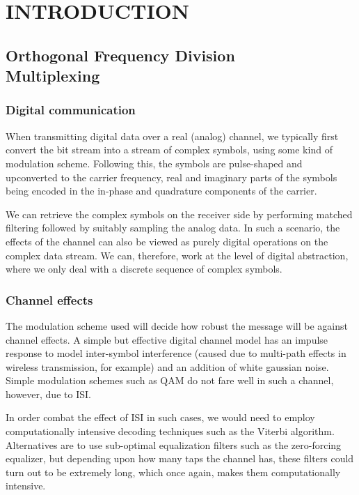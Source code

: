 \chapter{INTRODUCTION}
\label{chap:intro}

\section{Orthogonal Frequency Division \\ Multiplexing}

\subsection{Digital communication}
\label{subsec:digi-comm}

When transmitting digital data over a real (analog) channel, we typically first
convert the bit stream into a stream of complex symbols, using some kind of
modulation scheme. Following this, the symbols are pulse-shaped and upconverted
to the carrier frequency, real and imaginary parts of the symbols being encoded
in the in-phase and quadrature components of the carrier.

We can retrieve the complex symbols on the receiver side by performing matched
filtering followed by suitably sampling the analog data. In such a scenario,
the effects of the channel can also be viewed as purely digital operations on
the complex data stream. We can, therefore, work at the level of digital
abstraction, where we only deal with a discrete sequence of complex symbols.

\subsection{Channel effects}

The modulation scheme used will decide how robust the message will be against
channel effects. A simple but effective digital channel model has an impulse
response to model inter-symbol interference (caused due to multi-path effects
in wireless transmission, for example) and an addition of white gaussian noise.
Simple modulation schemes such as QAM do not fare well in such a channel,
however, due to ISI.

In order combat the effect of ISI in such cases, we would need to employ
computationally intensive decoding techniques such as the Viterbi algorithm.
Alternatives are to use sub-optimal equalization filters such as the
zero-forcing equalizer, but depending upon how many taps the channel has, these
filters could turn out to be extremely long, which once again, makes them
computationally intensive.

